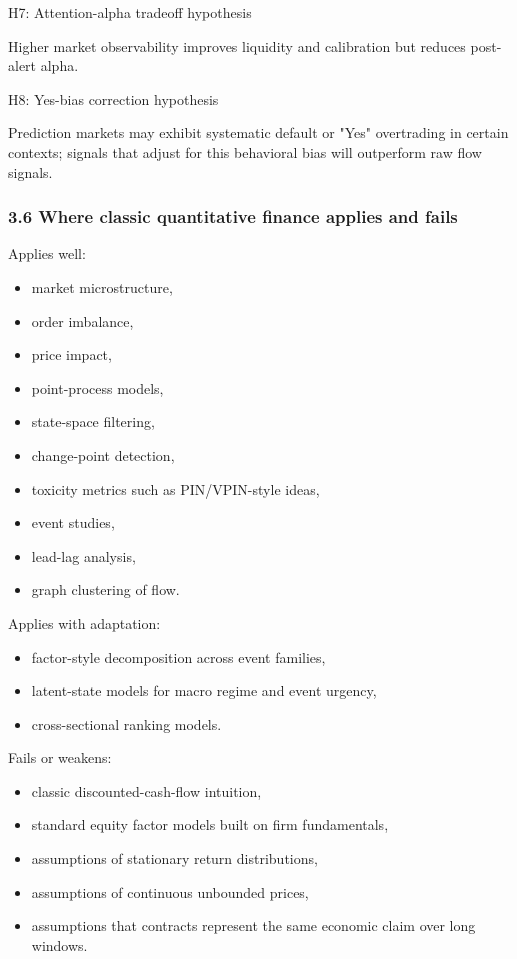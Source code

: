 \documentclass[
]{article}
\providecommand{\tightlist}{%
  \setlength{\itemsep}{0pt}\setlength{\parskip}{0pt}}
\begin{document}
H7: Attention-alpha tradeoff hypothesis

Higher market observability improves liquidity and calibration but
reduces post-alert alpha.

H8: Yes-bias correction hypothesis

Prediction markets may exhibit systematic default or "Yes" overtrading
in certain contexts; signals that adjust for this behavioral bias will
outperform raw flow signals.

\subsubsection{3.6 Where classic quantitative finance applies and
fails}\label{36-where-classic-quantitative-finance-applies-and-fails}

Applies well:

\begin{itemize}
\tightlist
\item
  market microstructure,
\item
  order imbalance,
\item
  price impact,
\item
  point-process models,
\item
  state-space filtering,
\item
  change-point detection,
\item
  toxicity metrics such as PIN/VPIN-style ideas,
\item
  event studies,
\item
  lead-lag analysis,
\item
  graph clustering of flow.
\end{itemize}

Applies with adaptation:

\begin{itemize}
\tightlist
\item
  factor-style decomposition across event families,
\item
  latent-state models for macro regime and event urgency,
\item
  cross-sectional ranking models.
\end{itemize}

Fails or weakens:

\begin{itemize}
\tightlist
\item
  classic discounted-cash-flow intuition,
\item
  standard equity factor models built on firm fundamentals,
\item
  assumptions of stationary return distributions,
\item
  assumptions of continuous unbounded prices,
\item
  assumptions that contracts represent the same economic claim over long
  windows.
\end{itemize}
\end{document}
